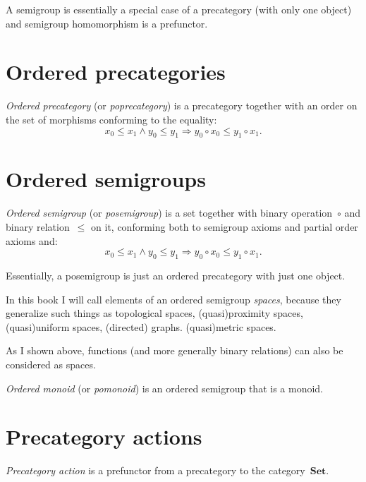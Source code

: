 \begin{note}
A semigroup is essentially a special case of a precategory (with only one object) and semigroup homomorphism is a prefunctor.
\end{note}

\chapter{Ordered precategories}

\begin{defn}
\emph{Ordered precategory} (or \emph{poprecategory}) is
a precategory together with an order on the set of morphisms conforming to the equality:
\[ x_0\leq x_1\land y_0\leq y_1\Rightarrow y_0\circ x_0\leq y_1\circ x_1. \]
\end{defn}

\chapter{Ordered semigroups}

\begin{defn}
\emph{Ordered semigroup} (or \emph{posemigroup}) is a set together with binary operation~$\circ$ and binary relation~$\leq$ on it, conforming both to semigroup axioms and partial order axioms and:
\[ x_0\leq x_1\land y_0\leq y_1\Rightarrow y_0\circ x_0\leq y_1\circ x_1. \]
\end{defn}

Essentially, a posemigroup is just an ordered precategory with just one object.

In this book I will call elements of an ordered semigroup \emph{spaces}, because they generalize such things as topological spaces, (quasi)proximity spaces, (quasi)uniform spaces, (directed) graphs. (quasi)metric spaces.

As I shown above, functions (and more generally binary relations) can also be considered as spaces.

\begin{defn}
\emph{Ordered monoid} (or \emph{pomonoid}) is an ordered semigroup that is a monoid.
\end{defn}

\chapter{Precategory actions}

\begin{defn}
\emph{Precategory action} is a prefunctor from a precategory to the category~$\mathbf{Set}$.
\end{defn}

